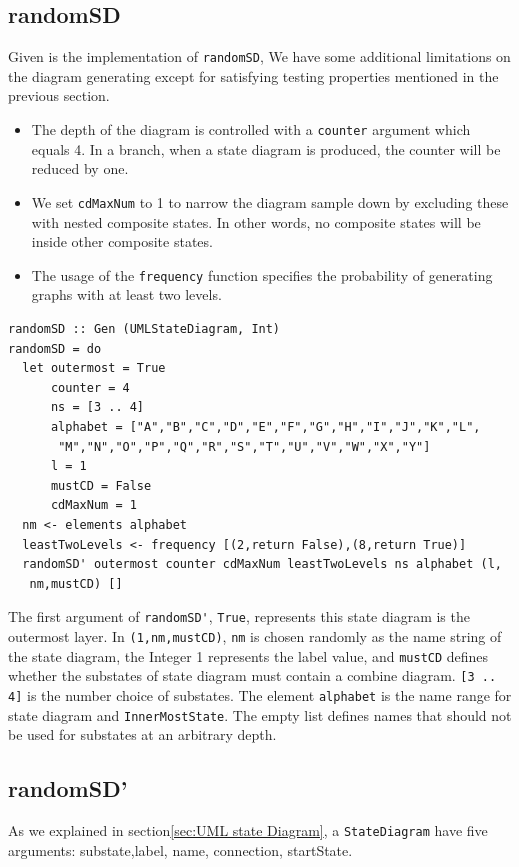 \subsection{randomSD}
Given is the implementation of \verb|randomSD|, We have some additional limitations on the diagram generating except for satisfying testing properties mentioned in the previous section.
\begin{itemize}
\item The depth of the diagram is controlled with a \verb|counter| argument which equals 4. In a branch, when a state diagram is produced, the counter will be reduced by one.
\end{itemize}
\begin{itemize}
\item We set \verb|cdMaxNum| to 1 to narrow the diagram sample down by excluding these with nested composite states. In other words, no composite states will be inside other composite states.
\end{itemize}
\begin{itemize}
\item The usage of the \verb|frequency| function specifies the probability of generating graphs with at least two levels.
\end{itemize}
\begin{verbatim}
randomSD :: Gen (UMLStateDiagram, Int)
randomSD = do
  let outermost = True
      counter = 4 
      ns = [3 .. 4]
      alphabet = ["A","B","C","D","E","F","G","H","I","J","K","L",
       "M","N","O","P","Q","R","S","T","U","V","W","X","Y"]
      l = 1
      mustCD = False
      cdMaxNum = 1 
  nm <- elements alphabet
  leastTwoLevels <- frequency [(2,return False),(8,return True)]
  randomSD' outermost counter cdMaxNum leastTwoLevels ns alphabet (l,
   nm,mustCD) [] 
\end{verbatim} 
The first argument of \verb|randomSD'|, \verb|True|, represents this state diagram is the outermost layer. 
In \verb|(1,nm,mustCD)|, \verb|nm| is chosen randomly as the name string of the state diagram,
the Integer 1 represents the label value, and \verb|mustCD| defines whether the substates of state diagram must contain a combine diagram. \verb|[3 .. 4]| is the number choice of substates. 
The element \verb|alphabet| is the name range for state diagram and \verb|InnerMostState|.
The empty list defines names that should not be used for substates at an arbitrary depth.



\subsection{randomSD'}
\label{subsec:randomSD'}
As we explained in section\ref{sec:UML state Diagram}, a \verb|StateDiagram| have five arguments: substate,label, name, connection, startState.

